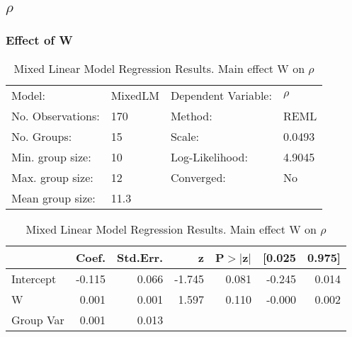 \documentclass{article}
\begin{document}
\subsection{$\rho$}
\subsubsection{Effect of W}
\begin{table}
    \caption{Mixed Linear Model Regression Results. Main effect W on $\rho$}
    \label{}
    \begin{center}
    \begin{tabular}{llll}
    \hline
    Model:            & MixedLM & Dependent Variable: & $\rho$  \\
    No. Observations: & 170     & Method:             & REML     \\
    No. Groups:       & 15      & Scale:              & 0.0493   \\
    Min. group size:  & 10      & Log-Likelihood:     & 4.9045   \\
    Max. group size:  & 12      & Converged:          & No       \\
    Mean group size:  & 11.3    &                     &          \\
    \hline
    \end{tabular}
    \end{center}
    
    \begin{center}
    \begin{tabular}{lrrrrrr}
    \hline
              &  Coef. & Std.Err. &      z & P$> |$z$|$ & [0.025 & 0.975]  \\
    \hline
    Intercept & -0.115 &    0.066 & -1.745 &       0.081 & -0.245 &  0.014  \\
    W         &  0.001 &    0.001 &  1.597 &       0.110 & -0.000 &  0.002  \\
    Group Var &  0.001 &    0.013 &        &             &        &         \\
    \hline
    \end{tabular}
    \end{center}
    \end{table}
\end{document}
